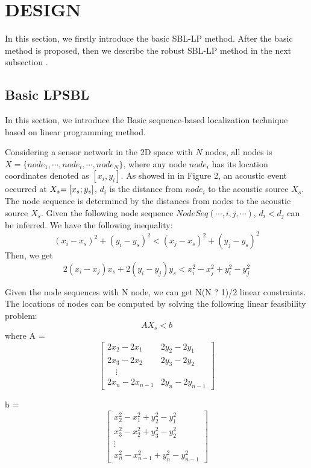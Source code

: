 
\section{DESIGN}

In this section, we firstly introduce the basic SBL-LP method. After the basic method is proposed, then we describe the robust SBL-LP method in the next subsection \cite{sallai2011acoustic}.

\subsection{Basic LPSBL}

In this section, we introduce the Basic sequence-based localization technique based on linear programming method.

Considering a sensor network in the 2D space with $N$ nodes, all nodes is $X = \{ nod{e_1}, \cdots ,nod{e_i}, \cdots ,nod{e_N}\}$, 
where any node $nod{e_i}$ has its location coordinates denoted as $[{x_i},{y_i}]$. 
As showed in  in Figure 2, an acoustic event occurred at ${X_s}{\rm{ = [}}{x_s};{y_s}]$, ${d_i}$ is the distance from $nod{e_i}$ to the acoustic source $X_s$.
The node sequence is determined by the distances from nodes to the acoustic source $X_s$. 
Given the following node sequence $NodeSeq( \cdots ,i,j, \cdots )$, ${d_i} < {d_j}$ can be inferred. We have the following inequality:
 \begin{equation} \label{3}
(x_i-x_s)^2+(y_i-y_s)^2 < (x_j-x_s)^2+(y_j-y_s)^2
 \end{equation}
Then, we get
\begin{equation}
2(x_i-x_j)x_s+2(y_i-y_j)y_s<x_i^2-x_j^2+y_i^2-y_j^2
\end{equation}

Given the node sequences with N node, we can get N(N ? 1)/2 linear constraints. The
locations of nodes can be computed by solving the following
linear feasibility problem:
\begin{equation}
AX_s<b
\end{equation}
where
A =
\[
\left[
\begin{array}{lcr}
2x_2-2x_1 & 2y_2-2y_1 \\
2x_3-2x_2 & 2y_3-2y_2 \\
\quad       \vdots \\
2x_n-2x_{n-1} & 2y_n-2y_{n-1}
\end{array}
\right]
\]

b =
\[
\left[
\begin{array}{lcr}
x_2^2-x_1^2+y_2^2-y_1^2 \\
x_3^2-x_2^2+y_3^2-y_2^2 \\
\vdots \\
x_n^2-x_{n-1}^2+y_n^2-y_{n-1}^2
\end{array}
\right]
\]

